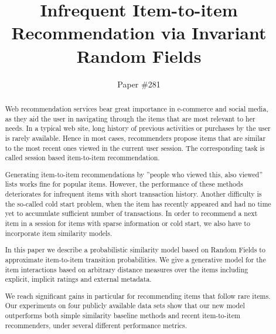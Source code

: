 \documentclass[sigconf]{acmart}
\begin{document}
\title{Infrequent Item-to-item Recommendation via Invariant Random Fields}

\author{Paper {\#}281}

%
%

\begin{abstract}
Web recommendation services bear great importance in e-commerce and social media, as they aid the user in navigating through the items that are most relevant to her needs. In a typical web site, long history of previous activities or purchases by the user is rarely available. Hence in most cases, recommenders propose items that are similar to the most recent ones viewed in the current user session. The corresponding task is called session based item-to-item recommendation.

Generating item-to-item recommendations by ''people who viewed this, also viewed'' lists works fine for popular items. However, the performance of these methods deteriorates for infrequent items with short transaction history. Another difficulty is the so-called cold start problem, when the item has recently appeared and had no time yet to accumulate sufficient number of transactions. In order to recommend a next item in a session for items with sparse information or cold start, we also have to incorporate item similarity models.

In this paper we describe a probabilistic similarity model based on Random Fields to approximate item-to-item transition probabilities. We give a generative model for the item interactions based on arbitrary distance measures over the items including explicit, implicit ratings and external metadata.

We reach significant gains in particular for recommending items that follow rare items. Our experiments on four publicly available data sets show that our new model outperforms both simple similarity baseline methods and recent item-to-item recommenders, under several different performance metrics.

\end{abstract}
\end{document}
